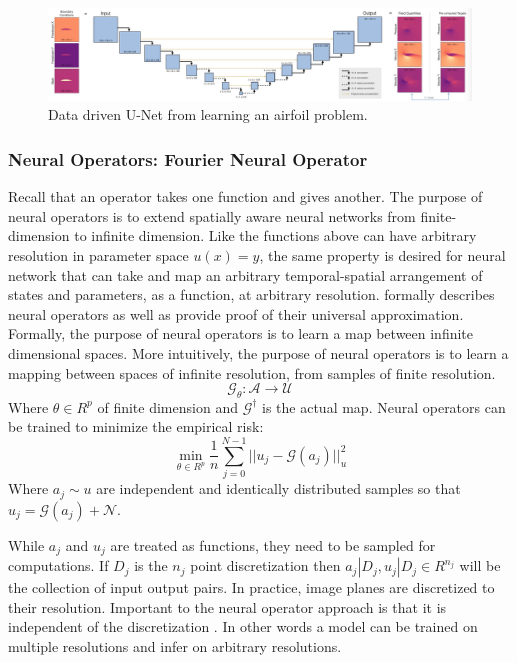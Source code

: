 \documentclass[]{article}
\begin{document}
\begin{figure}
	\centering
	\includegraphics[width=1\linewidth]{images/pbdl_unet}
	\caption[pbdlunet]{Data driven U-Net from \cite{pbdl_book} learning an airfoil problem.}
	\label{fig:pbdlunet}
\end{figure}

\subsubsection{Neural Operators: Fourier Neural Operator}
Recall that an operator takes one function and gives another.  The purpose of neural operators is to extend spatially aware neural networks from finite-dimension to infinite dimension.  Like the functions above can have arbitrary resolution in parameter space $u(x) = y$, the same property is desired for neural network that can take and map an arbitrary temporal-spatial arrangement of states and parameters, as a function, at arbitrary resolution.  \cite{neural_operators} formally describes neural operators as well as provide proof of their universal approximation.  Formally, the purpose of neural operators is to learn a map between infinite dimensional spaces.  More intuitively, the purpose of neural operators is to learn a mapping between spaces of infinite resolution, from samples of finite resolution.
\begin{equation}
\mathcal{G}_\theta: \mathcal{A} \rightarrow \mathcal{U}
\end{equation}
Where $\theta \in R^p$ of finite dimension and $\mathcal{G}^\dagger$ is the actual map.  Neural operators can be trained to minimize the empirical risk:
\begin{equation}
\min_{\theta \in R^p} \frac{1}{n}\sum_{j=0}^{N-1}||u_j - \mathcal{G}(a_j)||^2_u
\end{equation}
Where $ a_j \sim u$ are independent and identically distributed samples so that $u_j = \mathcal{G}(a_j) + \mathcal{N}$.  

While $a_j$ and $u_j$ are treated as functions, they need to be sampled for computations.  If $D_j$ is the $n_j$ point discretization then $a_j|D_j,u_j|D_j \in R^{n_j}$ will be the collection of input output pairs. In practice, image planes are discretized to their resolution.  Important to the neural operator approach is that it is independent of the discretization \cite{neural_operators}.  In other words a model can be trained on multiple resolutions and infer on arbitrary resolutions.
\end{document}
